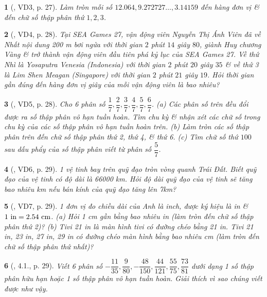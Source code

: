 \documentclass{article}
\newtheorem{baitoan}{}
\begin{document}
\begin{baitoan}[\cite{Binh_boi_duong_Toan_7_tap_1}, VD3, p. 27]
	Làm tròn mỗi số $12.064,9.272727\ldots,3.14159$ đến hàng đơn vị \& đến chữ số thập phân thứ $1,2,3$.
\end{baitoan}

\begin{baitoan}[\cite{Binh_boi_duong_Toan_7_tap_1}, VD4, p. 28]
	Tại SEA Games 27, vận động viên Nguyễn Thị Ánh Viên đã về Nhất nội dung {\rm200 m} bơi ngửa với thời gian $2$ phút $14$ giây $80$, giành Huy chương Vàng \& trở thành vận động viên đầu tiên phá kỷ lục của SEA Games 27. Về thứ Nhì là Yosaputra Venesia (Indonesia) với thời gian $2$ phút $20$ giây $35$ \& về thứ 3 là Lim Shen Meagan (Singapore) với thời gian $2$ phút $21$ giây $19$. Hỏi thời gian gần đúng đến hàng đơn vị giây của mỗi vận động viên là bao nhiêu?
\end{baitoan}

\begin{baitoan}[\cite{Binh_boi_duong_Toan_7_tap_1}, VD5, p. 28]
	Cho 6 phân số $\dfrac{1}{7},\dfrac{2}{7},\dfrac{3}{7},\dfrac{4}{7},\dfrac{5}{7},\dfrac{6}{7}$. (a) Các phân số trên đều đổi được ra số thập phân vô hạn tuần hoàn. Tìm chu kỳ \& nhận xét các chữ số trong chu kỳ của các số thập phân vô hạn tuần hoàn trên. (b) Làm tròn các số thập phân trên đến chữ số thập phân thứ 2, thứ 4, \& thứ 6. (c) Tìm chữ số thứ $100$ sau dấu phẩy của số thập phân viết từ phân số $\dfrac{5}{7}$.
\end{baitoan}

\begin{baitoan}[\cite{Binh_boi_duong_Toan_7_tap_1}, VD6, p. 29]
	1 vệ tinh bay trên quỹ đạo tròn vòng quanh Trái Đất. Biết quỹ đạo của vệ tinh có độ dài là {\rm66000 km}. Hỏi độ dài quỹ đạo của vệ tinh sẽ tăng bao nhiêu {\rm km} nếu bán kính của quỹ đạo tăng lên {\rm7km}? 
\end{baitoan}

\begin{baitoan}[\cite{Binh_boi_duong_Toan_7_tap_1}, VD7, p. 29]
	1 đơn vị đo chiều dài của Anh là inch, được ký hiệu là {\rm in} \& $\rm1\ in = 2.54\ cm$. (a) Hỏi {\rm1 cm} gần bằng bao nhiêu {\rm in} (làm tròn đến chữ số thập phân thứ 2)? (b) Tivi {\rm21 in} là màn hình tivi có đường chéo bằng {\rm21 in}. Tivi {\rm21 in, 23 in, 27 in, 29 in} có đường chéo màn hình bằng bao nhiêu {\rm cm} (làm tròn đến chữ số thập phân thứ nhất)? 
\end{baitoan}

\begin{baitoan}[\cite{Binh_boi_duong_Toan_7_tap_1}, 4.1., p. 29]
	Viết 6 phân số $-\dfrac{11}{35},\dfrac{9}{80},-\dfrac{48}{150},\dfrac{44}{121},\dfrac{55}{75},\dfrac{73}{81}$ dưới dạng 1 số thập phân hữu hạn hoặc 1 số thập phân vô hạn tuần hoàn. Giải thích vì sao chúng viết được như vậy.
\end{baitoan}
\end{document}
